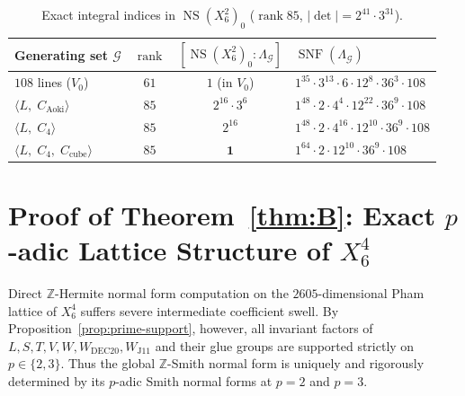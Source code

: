 \documentclass[11pt,a4paper]{amsart}
\theoremstyle{definition}
\newcommand{\ZZ}{\mathbb{Z}}
\newcommand{\NS}{\operatorname{NS}}
\newcommand{\SNF}{\operatorname{SNF}}
\newcommand{\rank}{\operatorname{rank}}
\begin{document}
\begin{table}[ht]
\centering
\caption{Exact integral indices in $\NS(X_6^2)_0$ ($\rank 85$, $|\det| = 2^{41}\cdot 3^{31}$).}\label{tab:x62}
\begin{tabular}{@{}lccl@{}}
\hline
Generating set $\mathcal{G}$ & $\rank$ & $[\NS(X_6^2)_0 : \Lambda_{\mathcal{G}}]$ & $\SNF(\Lambda_{\mathcal{G}})$ \\
\hline
$108$ lines ($V_0$) & $61$ & $1$ (in $V_0$) & $1^{35}\cdot 3^{13}\cdot 6\cdot 12^8\cdot 36^3\cdot 108$ \\
$\langle L,\; C_{\mathrm{Aoki}} \rangle$ & $85$ & $2^{16}\cdot 3^6$ & $1^{48}\cdot 2\cdot 4^4\cdot 12^{22}\cdot 36^9\cdot 108$ \\
$\langle L,\; C_4 \rangle$ & $85$ & $2^{16}$ & $1^{48}\cdot 2\cdot 4^{16}\cdot 12^{10}\cdot 36^9\cdot 108$ \\
$\langle L,\; C_4,\; C_{\mathrm{cube}} \rangle$ & $85$ & $\mathbf{1}$ & $1^{64}\cdot 2\cdot 12^{10}\cdot 36^9\cdot 108$ \\
\hline
\end{tabular}
\end{table}

\section{Proof of Theorem~\ref{thm:B}: Exact \texorpdfstring{$p$}{p}-adic Lattice Structure of \texorpdfstring{$X_6^4$}{X\_6\^{}4}}

Direct $\ZZ$-Hermite normal form computation on the $2605$-dimensional Pham lattice of $X_6^4$ suffers severe intermediate coefficient swell. By Proposition~\ref{prop:prime-support}, however, all invariant factors of $L, S, T, V, W, W_{\mathrm{DEC20}}, W_{\mathrm{J11}}$ and their glue groups are supported strictly on $p \in \{2, 3\}$. Thus the global $\ZZ$-Smith normal form is uniquely and rigorously determined by its $p$-adic Smith normal forms at $p = 2$ and $p = 3$.
\end{document}
